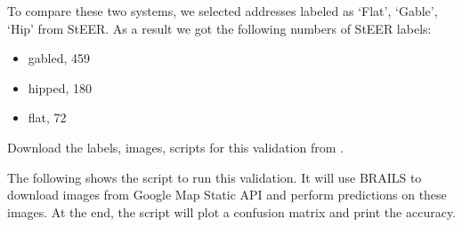 \documentclass[letterpaper,10pt,english]{sphinxmanual}
\begin{document}
\sphinxAtStartPar
To compare these two systems, we selected addresses labeled as ‘Flat’, ‘Gable’, ‘Hip’ from StEER.
As a result we got the following numbers of StEER labels:
\begin{itemize}
\item {} 
\sphinxAtStartPar
gabled,    459

\item {} 
\sphinxAtStartPar
hipped,    180

\item {} 
\sphinxAtStartPar
flat,       72

\end{itemize}

\sphinxAtStartPar
Download the labels, images, scripts for this validation from .

\sphinxAtStartPar
The following shows the script to run this validation.
It will use BRAILS to download images from Google Map Static API and perform predictions on these images.
At the end, the script will plot a confusion matrix and print the accuracy.
\end{document}
